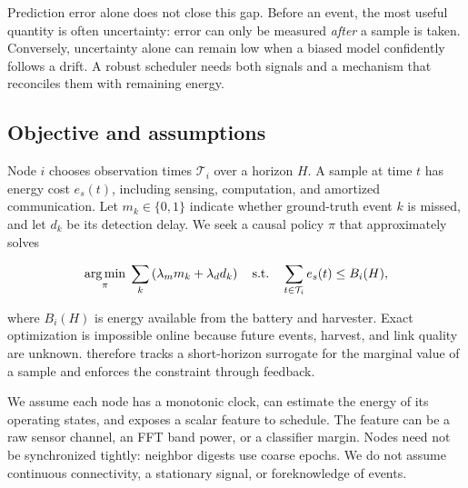 Prediction error alone does not close this gap.  Before an event, the most
useful quantity is often uncertainty: error can only be measured \emph{after} a
sample is taken.  Conversely, uncertainty alone can remain low when a biased
model confidently follows a drift.  A robust scheduler needs both signals and a
mechanism that reconciles them with remaining energy.

\subsection{Objective and assumptions}

Node $i$ chooses observation times $\mathcal{T}_i$ over a horizon $H$.  A
sample at time $t$ has energy cost $e_s(t)$, including sensing, computation, and
amortized communication.  Let $m_k\in\{0,1\}$ indicate whether ground-truth
event $k$ is missed, and let $d_k$ be its detection delay.  We seek a causal
policy $\pi$ that approximately solves

\begin{equation}
\label{eq:objective}
  \operatorname*{arg\,min}_{\pi}\; \sum_k \left(\lambda_m m_k+\lambda_d d_k\right)
  \quad \text{s.t.}\quad
  \sum_{t\in\mathcal{T}_i} e_s(t) \leq B_i(H),
\end{equation}

where $B_i(H)$ is energy available from the battery and harvester.  Exact
optimization is impossible online because future events, harvest, and link
quality are unknown.  \system therefore tracks a short-horizon surrogate for
the marginal value of a sample and enforces the constraint through feedback.

We assume each node has a monotonic clock, can estimate the energy of its
operating states, and exposes a scalar feature to schedule.  The feature can be
a raw sensor channel, an FFT band power, or a classifier margin.  Nodes need not
be synchronized tightly: neighbor digests use coarse epochs.  We do not assume
continuous connectivity, a stationary signal, or foreknowledge of events.
